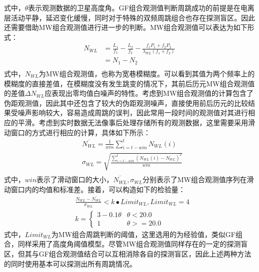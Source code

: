 式中，\(\theta\)表示观测数据的卫星高度角。GF组合观测值判断周跳成功的前提是在电离层活动平静，延迟变化缓慢，同时对于特殊的双频周跳组合也存在探测盲区。因此还需要借助MW组合观测值进行进一步的判断。MW组合观测值可以表达为如下形式：
\begin{equation}
	\begin{aligned}
		 N_{WL} & =\frac{L_{1}}{f_{1}}-\frac{L_{2}}{f_{2}}-\frac{f_{1}P_{1}+f_{2}P_{2}}{\lambda_{WL}(f_{1}+f_{2})} \\
		& = N_{1}-N_{2}\\
	\end{aligned}	
\end{equation}
式中，\(N_{WL}\)为MW组合观测值，也称为宽巷模糊度。可以看到其值为两个频率上的模糊度的直接差值，在模糊度没有发生跳变的情况下，其前后历元MW组合观测值的差值\(\Delta N_{WL}\)应表现出零均值白噪声的特性。考虑到MW组合观测值的计算包含了伪距观测值，因此其中还包含了较大的伪距观测噪声，直接使用前后历元的比较结果受噪声影响较大，容易造成周跳的误判，因此常用一段时间的观测值对其进行相应的平滑。考虑到实时数据无法像事后处理存储所有的观测数据，这里需要采用滑动窗口的方式进行相应的计算，具体如下所示：
\begin{equation}
	\begin{aligned}
		& \overline{N_{WL}}=\frac{1}{win}\sum_{i=t-win}^{t}N_{WL}(i) \\ 
		& \sigma_{WL}=\sqrt{\frac{\sum_{i=t-win}^{t}(N_{WL}(i)-\overline{N_{WL}})^{2}}{win}} \\
	\end{aligned}
\end{equation}
式中，\(win\)表示了滑动窗口的大小，\(\overline{N_{WL}},\sigma_{WL}\)分别表示了MW组合观测值序列在滑动窗口内的均值和标准差。接着，可以构造如下的检验量：
\begin{equation}
	\begin{aligned}
		& \frac{N_{WL}-\overline{N_{WL}}}{\sigma_{WL}} < k\bullet Limit_{WL},Limit_{WL}=4 \\ 
		& k=\begin{cases}
			3-0.1\theta & \theta < 20.0 \\ 
			1 &  \theta >=20.0
		\end{cases}	
	\end{aligned}
\end{equation}
式中，\(Limit_{WL}\)为MW组合周跳判断的阈值，这里选用的为经验值，类似GF组合，同样采用了高度角阈值模型。尽管MW组合观测值同样存在的一定的探测盲区，但其与GF组合观测值结合可以互相消除各自的探测盲区，因此上述两种方法的同时使用基本可以探测出所有周跳情况。

